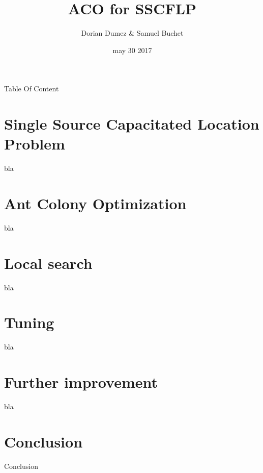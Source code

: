 \documentclass{beamer}
\title{ACO for SSCFLP}
\author{Dorian Dumez \& Samuel Buchet}
\date{may 30 2017}
\begin{document}
\begin{frame}
  \titlepage
\end{frame}

\begin{frame}{Table Of Content}
  \tableofcontents
\end{frame}

\section{Single Source Capacitated Location Problem}

\begin{frame}{bla}

\end{frame}


\section{Ant Colony Optimization}

\begin{frame}{bla}

\end{frame}

\section{Local search}

\begin{frame}{bla}

\end{frame}

\section{Tuning}

\begin{frame}{bla}

\end{frame}

\section{Further improvement}

\begin{frame}{bla}

\end{frame}

\section*{Conclusion}

\begin{frame}{Conclusion}

\end{frame}
\end{document}
